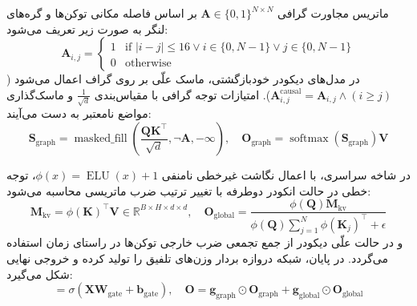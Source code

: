 ماتریس مجاورت گرافی $\mathbf{A} \in \{0, 1\}^{N \times N}$ بر اساس فاصله مکانی توکن‌ها و گره‌های لنگر به صورت زیر تعریف می‌شود:
\begin{equation}
\mathbf{A}_{i, j} = \begin{cases} 
1 & \text{if } |i - j| \le 16 \lor i \in \{0, N-1\} \lor j \in \{0, N-1\} \\
0 & \text{otherwise}
\end{cases}
\end{equation}
در مدل‌های دیکودر خودبازگشتی، ماسک علّی بر روی گراف اعمال می‌شود ($\mathbf{A}_{i,j}^{\text{causal}} = \mathbf{A}_{i,j} \land (i \ge j)$). امتیازات توجه گرافی با مقیاس‌بندی $\frac{1}{\sqrt{d}}$ و ماسک‌گذاری مواضع نامعتبر به دست می‌آیند:
\begin{equation}
\mathbf{S}_{\text{graph}} = \operatorname{masked\_fill}\left(\frac{\mathbf{Q} \mathbf{K}^\top}{\sqrt{d}}, \neg \mathbf{A}, -\infty\right), \quad \mathbf{O}_{\text{graph}} = \operatorname{softmax}(\mathbf{S}_{\text{graph}}) \mathbf{V}
\end{equation}

در شاخه سراسری، با اعمال نگاشت غیرخطی نامنفی $\phi(x) = \operatorname{ELU}(x) + 1$، توجه خطی در حالت انکودر دوطرفه با تغییر ترتیب ضرب ماتریسی محاسبه می‌شود:
\begin{equation}
\mathbf{M}_{\text{kv}} = \phi(\mathbf{K})^\top \mathbf{V} \in \mathbb{R}^{B \times H \times d \times d}, \quad \mathbf{O}_{\text{global}} = \frac{\phi(\mathbf{Q}) \mathbf{M}_{\text{kv}}}{\phi(\mathbf{Q}) \sum_{j=1}^N \phi(\mathbf{K}_j)^\top + \epsilon}
\end{equation}
و در حالت علّی ديكودر از جمع تجمعی ضرب خارجی توکن‌ها در راستای زمان استفاده می‌گردد. در پایان، شبکه دروازه بردار وزن‌های تلفیق را تولید کرده و خروجی نهایی شکل می‌گیرد:
\begin{equation}
[\mathbf{g}_{\text{graph}}, \mathbf{g}_{\text{global}}] = \sigma(\mathbf{X} \mathbf{W}_{\text{gate}} + \mathbf{b}_{\text{gate}}), \quad \mathbf{O} = \mathbf{g}_{\text{graph}} \odot \mathbf{O}_{\text{graph}} + \mathbf{g}_{\text{global}} \odot \mathbf{O}_{\text{global}}
\end{equation}

